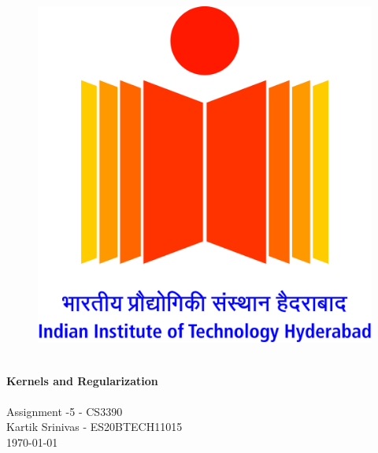 \begin{titlepage}
    \vbox{ }

    \vbox{ }

    \begin{center}
        \begin{figure}
            \centering
            \includegraphics[scale=0.1]{img/logo.jpg}
            \label{fig:my_label}
        \end{figure}
        

        \noindent\makebox[\linewidth]{\rule{.7\paperwidth}{.6pt}}\\[0.7cm]
        { \huge \bfseries Kernels and Regularization }\\[0.25cm]
        \noindent\makebox[\linewidth]{\rule{.7\paperwidth}{.6pt}}\\[0.7cm]
        \large{Assignment -5 - CS3390}\\[1.2cm]
        \vfill
        \large
        Kartik Srinivas - ES20BTECH11015\\
            {\large \today}
    \end{center}
\end{titlepage}